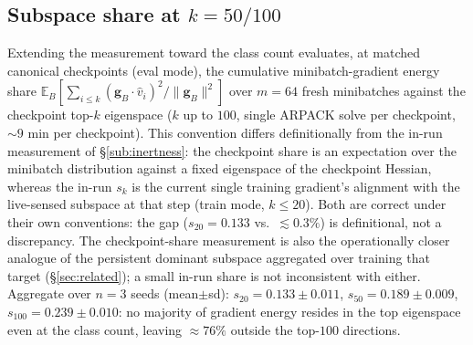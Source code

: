 \documentclass{article}
\theoremstyle{plain}
\theoremstyle{definition}
\theoremstyle{remark}
\begin{document}
\subsection{Subspace share at \texorpdfstring{$k{=}50/100$}{k=50/100}}
\label{sub:k100}
Extending the measurement toward the class count evaluates, at matched
canonical checkpoints (eval mode), the cumulative minibatch-gradient
energy share $\mathbb{E}_{B}[\sum_{i\le
k}(\mathbf{g}_{B}\!\cdot\!\hat v_{i})^{2}/\|\mathbf{g}_{B}\|^{2}]$
over $m{=}64$ fresh minibatches against the checkpoint top-$k$
eigenspace ($k$ up to $100$, single ARPACK solve per checkpoint,
${\sim}9$ min per checkpoint). This convention differs definitionally
from the in-run measurement of
\S\ref{sub:inertness}: the checkpoint share is an expectation over
the minibatch distribution against a fixed eigenspace of the
checkpoint Hessian, whereas the in-run $s_k$ is the current single
training gradient's alignment with the live-sensed subspace at that
step (train mode, $k\le20$). Both are correct under their own
conventions: the gap ($s_{20}{=}0.133$ vs.\ ${\lesssim}0.3\%$) is
definitional, not a discrepancy. The checkpoint-share measurement is
also the operationally closer analogue of the persistent dominant
subspace aggregated over training that \citet{song2025bulk} target
(\S\ref{sec:related}); a small in-run share is not inconsistent with
either. Aggregate over $n{=}3$ seeds (mean$\pm$sd):
$s_{20}=0.133\pm0.011$, $s_{50}=0.189\pm0.009$,
$s_{100}=0.239\pm0.010$: no majority of gradient energy resides in
the top eigenspace even at the class count, leaving ${\approx}76\%$
outside the top-$100$ directions.
\end{document}
